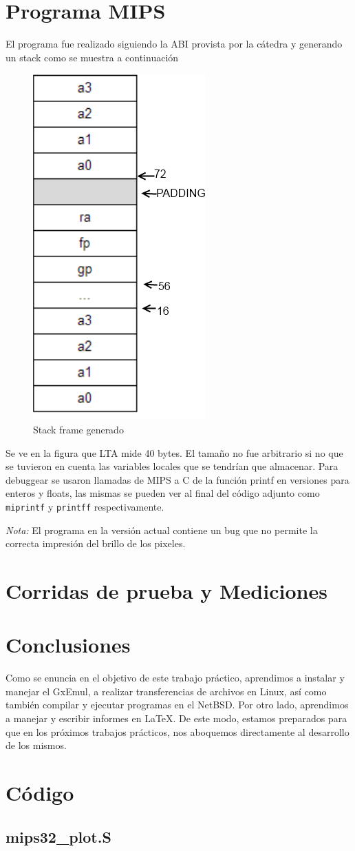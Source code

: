 \documentclass[a4paper,10pt,oneside]{article}
\begin{document}
	\section{Programa MIPS}
	El programa fue realizado siguiendo la ABI provista por la cátedra y generando un stack como se muestra a continuación
	\begin{figure}[H]
		\begin{center}
			\includegraphics[height=0.50\textwidth]{ABI.png}
		\end{center}
		\caption{Stack frame generado} \label{Figura 1}
	\end{figure}
	Se ve en la figura que LTA mide 40 bytes. El tamaño no fue arbitrario si no que se tuvieron en cuenta las variables locales que se tendrían que almacenar.
	Para debuggear se usaron llamadas de MIPS a C de la función printf en versiones para enteros y floats, las mismas se pueden ver al final del código adjunto como \texttt{miprintf} y \texttt{printff} respectivamente.
	
	\emph{Nota:} El programa en la versión actual contiene un bug que no permite la correcta impresión del brillo de los pixeles.  


	
	
\section{Corridas de prueba y Mediciones}



\section{Conclusiones}	
	Como se enuncia en el objetivo de este trabajo práctico, aprendimos a instalar y manejar el GxEmul, a realizar transferencias de archivos en Linux, así como también compilar y ejecutar programas en el NetBSD. Por otro lado,  aprendimos a manejar y escribir informes en \LaTeX{}.
	De este modo, estamos preparados para que en los próximos trabajos prácticos, nos aboquemos directamente al desarrollo de los mismos.


\newpage 
\section{Código}
\subsection{mips32\_plot.S}
\lstset{ language = [x86masm]assembler }


\newpage 
\end{document}
